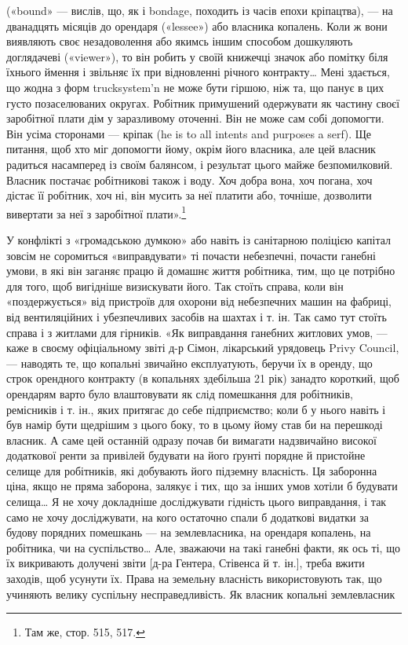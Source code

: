\parcont{}  %
(«bound» — вислів, що, як і bondage, походить із часів епохи
кріпацтва), — на дванадцять місяців до орендаря («lessee») або
власника копалень. Коли ж вони виявляють своє незадоволення
або якимсь іншим способом дошкуляють доглядачеві («viewer»),
то він робить у своїй книжечці значок або помітку біля їхнього
ймення і звільняє їх при відновленні річного контракту\dots{} Мені
здається, що жодна з форм trucksystem’n не може бути гіршою,
ніж та, що панує в цих густо позаселюваних округах. Робітник
примушений одержувати як частину своєї заробітної плати дім
у заразливому оточенні. Він не може сам собі допомогти. Він
усіма сторонами — кріпак (he is to all intents and purposes a
serf). Ще питання, щоб хто міг допомогти йому, окрім його власника,
але цей власник радиться насамперед із своїм балянсом,
і результат цього майже безпомилковий. Власник постачає робітникові
також і воду. Хоч добра вона, хоч погана, хоч дістає
її робітник, хоч ні, він мусить за неї платити або, точніше, дозволити
вивертати за неї з заробітної плати».\footnote{
Там же, стор. 515, 517.
}

У конфлікті з «громадською думкою» або навіть із санітарною
поліцією капітал зовсім не соромиться «виправдувати»
ті почасти небезпечні, почасти ганебні умови, в які він заганяє
працю й домашнє життя робітника, тим, що це потрібно для того,
щоб вигідніше визискувати його. Так стоїть справа, коли він
«поздержується» від пристроїв для охорони від небезпечних машин
на фабриці, від вентиляційних і убезпечливих засобів на шахтах
і т. ін. Так само тут стоїть справа і з житлами для гірників. «Як
виправдання ганебних житлових умов, — каже в своєму офіціальному
звіті д-р Сімон, лікарський урядовець Privy Council, —
наводять те, що копальні звичайно експлуатують, беручи їх в
оренду, що строк орендного контракту (в копальнях здебільша
21 рік) занадто короткий, щоб орендарям варто було влаштовувати
як слід помешкання для робітників, ремісників і т. ін.,
яких притягає до себе підприємство; коли б у нього навіть і був
намір бути щедрішим з цього боку, то в цьому йому став би на
перешкоді власник. А саме цей останній одразу почав би вимагати
надзвичайно високої додаткової ренти за привілей будувати
на його ґрунті порядне й пристойне селище для робітників,
які добувають його підземну власність. Ця заборонна ціна, якщо
не пряма заборона, залякує і тих, що за інших умов хотіли б
будувати селища\dots{} Я не хочу докладніше досліджувати гідність
цього виправдання, і так само не хочу досліджувати, на кого
остаточно спали б додаткові видатки за будову порядних помешкань
— на землевласника, на орендаря копалень, на робітника,
чи на суспільство\dots{} Але, зважаючи на такі ганебні факти, як
ось ті, що їх викривають долучені звіти [д-ра Гентера, Стівенса
й т. ін.], треба вжити заходів, щоб усунути їх. Права
на земельну власність використовують так, що учиняють велику
суспільну несправедливість. Як власник копальні землевласник
\parbreak{}  %
